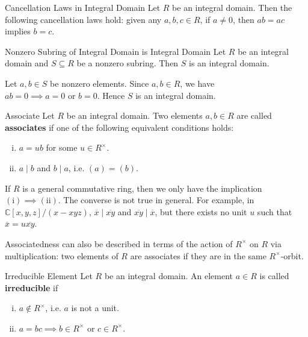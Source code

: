\begin{proposition}{Cancellation Laws in Integral Domain}{}
    Let $R$ be an integral domain. Then the following cancellation laws hold: given any $a,b,c\in R$, if $a \ne 0$, then $ab = ac$ implies $b = c$.
\end{proposition}

\begin{proposition}{Nonzero Subring of Integral Domain is Integral Domain}{}
    Let $R$ be an integral domain and $S\subseteq R$ be a nonzero subring. Then $S$ is an integral domain.
\end{proposition}
\begin{prf}
    Let $a,b\in S$ be nonzero elements. Since $a,b\in R$, we have $ab=0\implies a=0\text{ or }b=0$. Hence $S$ is an integral domain.
\end{prf}

\begin{definition}{Associate}{}
    Let $R$ be an integral domain. Two elements $a,b\in R$ are called \textbf{associates} if one of the following equivalent conditions holds:
    \begin{enumerate}[(i)]
        \item $a=ub$ for some $u\in R^\times$.
        \item $a\mid b$ and $b\mid a$, i.e. $(a)=(b)$.
    \end{enumerate}
\end{definition}

If $R$ is a general commutative ring, then we only have the implication $(\mathrm i)\implies (\mathrm{ii})$. The converse is not true in general. For example, in $\mathbb{C}[x,y,z]/(x-xyz)$, $\overline{x}\mid \overline{xy}$ and $\overline{xy}\mid \overline{x}$, but there exists no unit $u$ such that $\overline{x}=u\overline{xy}$.

Associatedness can also be described in terms of the action of $R^\times$ on $R$ via multiplication: two elements of $R$ are associates if they are in the same $R^\times$-orbit.
\begin{definition}{Irreducible Element}{}
    Let $R$ be an integral domain. An element $a\in R$ is called \textbf{irreducible} if
    \begin{enumerate}[(i)]
        \item $a\notin R^\times$, i.e. $a$ is not a unit.
        \item $a=bc\implies b\in R^\times\text{ or }c\in R^\times$.
    \end{enumerate}    
\end{definition}

